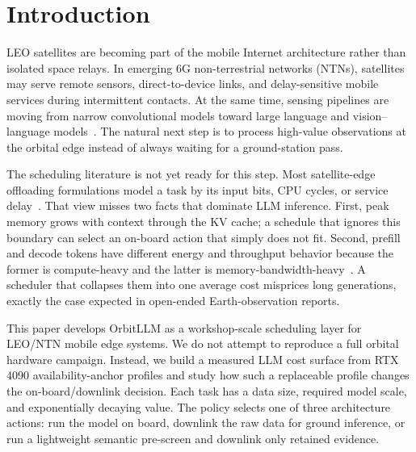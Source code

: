 \section{Introduction}
\label{sec:intro}

LEO satellites are becoming part of the mobile Internet architecture rather than isolated space relays. In emerging 6G non-terrestrial networks (NTNs), satellites may serve remote sensors, direct-to-device links, and delay-sensitive mobile services during intermittent contacts. At the same time, sensing pipelines are moving from narrow convolutional models toward large language and vision--language models~\cite{huo2025when,weng2025visionlanguage,mai2024opportunities}. The natural next step is to process high-value observations at the orbital edge instead of always waiting for a ground-station pass.

The scheduling literature is not yet ready for this step. Most satellite-edge offloading formulations model a task by its input bits, CPU cycles, or service delay~\cite{li2025delaycost,zhao2025region,gao2024hierarchical}. That view misses two facts that dominate LLM inference. First, peak memory grows with context through the KV cache; a schedule that ignores this boundary can select an on-board action that simply does not fit. Second, prefill and decode tokens have different energy and throughput behavior because the former is compute-heavy and the latter is memory-bandwidth-heavy~\cite{li2024survey,kim2025oaken}. A scheduler that collapses them into one average cost misprices long generations, exactly the case expected in open-ended Earth-observation reports.

This paper develops OrbitLLM as a workshop-scale scheduling layer for LEO/NTN mobile edge systems. We do not attempt to reproduce a full orbital hardware campaign. Instead, we build a measured LLM cost surface from RTX 4090 availability-anchor profiles and study how such a replaceable profile changes the on-board/downlink decision. Each task has a data size, required model scale, and exponentially decaying value. The policy selects one of three architecture actions: run the model on board, downlink the raw data for ground inference, or run a lightweight semantic pre-screen and downlink only retained evidence.

